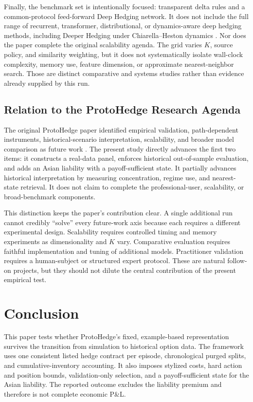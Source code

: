 \documentclass[sigconf]{acmart}
\begin{document}
Finally, the benchmark set is intentionally focused: transparent delta rules
and a common-protocol feed-forward Deep Hedging network. It does not include the
full range of recurrent, transformer, distributional, or dynamics-aware deep
hedging methods, including Deeper Hedging under Chiarella--Heston dynamics
\cite{gao2023deeper}. Nor does the paper complete the original scalability
agenda. The grid varies $K$, source policy, and similarity weighting, but it
does not systematically isolate wall-clock complexity, memory use, feature
dimension, or approximate nearest-neighbor search. Those are distinct
comparative and systems studies rather than evidence already supplied by this
run.

\subsection{Relation to the ProtoHedge Research Agenda}

The original ProtoHedge paper identified empirical validation,
path-dependent instruments, historical-scenario interpretation, scalability,
and broader model comparison as future work \cite{faloughi2025protohedge}. The
present study directly advances the first two items: it constructs a real-data
panel, enforces historical out-of-sample evaluation, and adds an Asian
liability with a payoff-sufficient state. It partially advances historical
interpretation by measuring concentration, regime use, and nearest-state
retrieval. It does not claim to complete the professional-user, scalability,
or broad-benchmark components.

This distinction keeps the paper's contribution clear. A single additional
run cannot credibly ``solve'' every future-work axis because each requires a
different experimental design. Scalability requires controlled timing and
memory experiments as dimensionality and $K$ vary. Comparative evaluation
requires faithful implementation and tuning of additional models. Practitioner
validation requires a human-subject or structured expert protocol. These are
natural follow-on projects, but they should not dilute the central contribution
of the present empirical test.

\section{Conclusion}

This paper tests whether ProtoHedge's fixed, example-based representation
survives the transition from simulation to historical option data. The
framework uses one consistent listed hedge contract per episode, chronological
purged splits, and cumulative-inventory accounting. It also imposes stylized
costs, hard action and position bounds, validation-only selection, and a
payoff-sufficient state for the Asian liability. The reported outcome excludes
the liability premium and therefore is not complete economic P\&L.
\end{document}

